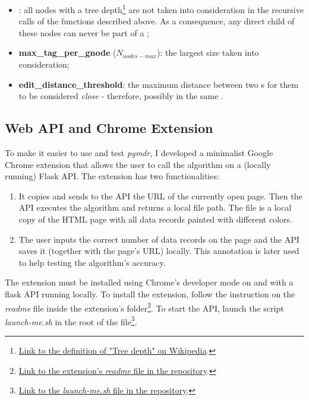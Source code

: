 \documentclass[10pt]{article}
\newcommand{\maxnodes}{N_{nodes-max}}
\newcommand{\gn}{\path{GNode}}
\newcommand{\dr}{\path{DataRegion}}
\newcommand{\drec}{\path{DataRecord}}
\begin{document}
\begin{itemize}
    
    \item \textbf{}: all nodes with a tree depth\footnote{\href{https://en.wikipedia.org/wiki/Tree-depth}{Link to the definition of "Tree depth" on Wikipedia}.} are not taken into consideration in the recursive calls of the functions described above. As a consequence, any direct child of these nodes can never be part of a \drec{} ;
    
    \item \textbf{max\_tag\_per\_gnode} ($\maxnodes$): the largest \gn{}  size taken into consideration;
    
    \item \textbf{edit\_distance\_threshold}: the maximum distance between two \gn{} s for them to be considered \emph{close} - therefore, possibly in the same\dr{} .
    
\end{itemize}



\subsection{Web API and Chrome Extension}

To make it easier to use and test \emph{pymdr}, I developed a minimalist Google Chrome extension that allows the user to call the algorithm on a (locally running) Flask API. The extension has two functionalities:  

\begin{enumerate}
    
    \item It copies and sends to the API the URL of the currently open page. Then the API executes the algorithm and returns a local file path. The file is a local copy of the HTML page with all data records painted with different colors.
    
    \item The user inputs the correct number of data records on the page and the API saves it (together with the page's URL) locally. This annotation is later used to help testing the algorithm's accuracy.
    
\end{enumerate}

The extension must be installed using Chrome's developer mode on and with a flask API running locally. To install the extension, follow the instruction on the \emph{readme} file inside the extension's folder\footnote{\href{https://github.com/joaopcbertoldo/pymdr/blob/7ff7f7653feff23704b6b786db8499188ba378af/src/extension/readme.txt\#L1}{Link to the extension's \emph{readme} file in the repository}.}. To start the API, launch the script \emph{launch-me.sh} in the root of the file\footnote{\href{https://github.com/joaopcbertoldo/pymdr/blob/7ff7f7653feff23704b6b786db8499188ba378af/launch-api.sh\#L1}{Link to the \emph{launch-me.sh} file in the repository}.}.
\end{document}
